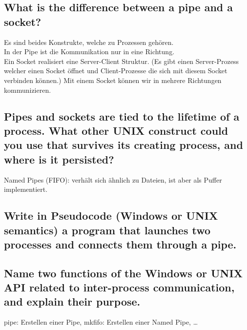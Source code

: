 \subsection{What is the difference between a pipe and a socket?}
Es sind beides Konstrukte, welche zu Prozessen gehören.\\
In der Pipe ist die Kommunikation nur in eine Richtung.\\
Ein Socket realisiert eine Server-Client Struktur.
(Es gibt einen Server-Prozess welcher einen Socket öffnet und Client-Prozesse die sich mit diesem Socket verbinden können.)
Mit einem Socket können wir in mehrere Richtungen kommunizieren.

\subsection{Pipes and sockets are tied to the lifetime of a process. What other UNIX construct could you use that survives its creating process, and where is it persisted?}
Named Pipes (FIFO): verhält sich ähnlich zu Dateien, ist aber als Puffer implementiert.

\subsection{Write in Pseudocode (Windows or UNIX semantics) a program that launches two processes and connects them through a pipe.}
\missing

\subsection{Name two functions of the Windows or UNIX API related to inter-process communication, and explain their purpose.}
pipe: Erstellen einer Pipe, mkfifo: Erstellen einer Named Pipe, \dots
